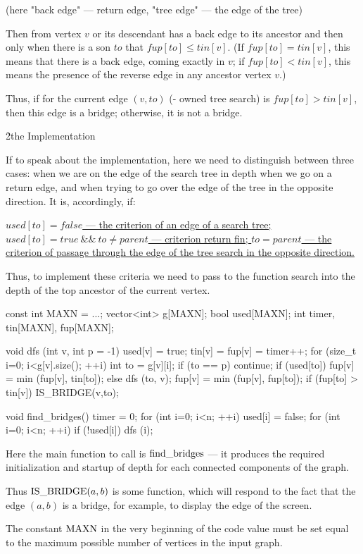 (here "back edge" --- return edge, "tree edge" --- the edge of the tree)

Then from vertex $v$ or its descendant has a back edge to its ancestor and then only when there is a son $to$ that $fup[to] \le tin[v]$. (If $fup[to] = tin[v]$, this means that there is a back edge, coming exactly in $v$; if $fup[to] < tin[v]$, this means the presence of the reverse edge in any ancestor vertex $v$.)

Thus, if for the current edge $(v,to)$ (- owned tree search) is $fup[to] > tin[v]$, then this edge is a bridge; otherwise, it is not a bridge.


\h2{the Implementation}

If to speak about the implementation, here we need to distinguish between three cases: when we are on the edge of the search tree in depth when we go on a return edge, and when trying to go over the edge of the tree in the opposite direction. It is, accordingly, if:

\ul{
\li $used[to]=false$ --- the criterion of an edge of a search tree;
\li $used[to]=true\ \&\&\ to \ne parent$ --- criterion return fin;
\li $to=parent$ --- the criterion of passage through the edge of the tree search in the opposite direction.
}

Thus, to implement these criteria we need to pass to the function search into the depth of the top ancestor of the current vertex.

\code
const int MAXN = ...;
vector<int> g[MAXN];
bool used[MAXN];
int timer, tin[MAXN], fup[MAXN];

void dfs (int v, int p = -1) {
used[v] = true;
tin[v] = fup[v] = timer++;
for (size_t i=0; i<g[v].size(); ++i) {
int to = g[v][i];
if (to == p) continue;
if (used[to])
fup[v] = min (fup[v], tin[to]);
else {
dfs (to, v);
fup[v] = min (fup[v], fup[to]);
if (fup[to] > tin[v])
IS_BRIDGE(v,to);
}
}
}

void find_bridges() {
timer = 0;
for (int i=0; i<n; ++i)
used[i] = false;
for (int i=0; i<n; ++i)
if (!used[i])
dfs (i);
}
\endcode

Here the main function to call is ${\rm find\_bridges}$ --- it produces the required initialization and startup of depth for each connected components of the graph.

Thus ${\rm IS\_BRIDGE}(a,b)$ is some function, which will respond to the fact that the edge $(a,b)$ is a bridge, for example, to display the edge of the screen.

The constant ${\rm MAXN}$ in the very beginning of the code value must be set equal to the maximum possible number of vertices in the input graph.

